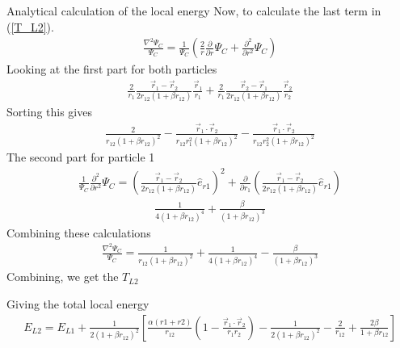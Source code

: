 \documentclass[a4paper, 12pt, titlepage]{article}
\begin{document}
\begin{section}{Analytical calculation of the local energy}
 Now, to calculate the last term in (\ref{T_L2}). 
 \begin{align}
 	\frac{\nabla^2 \Psi_C}{\Psi_C} = \frac{1}{\Psi_C} \left( \frac{2}{r} \frac{\partial}{\partial r}\Psi_C + \frac{\partial^2 }{\partial r^2} \Psi_C \right)
 \end{align}
 Looking at the first part for both particles
 \begin{align*}
 	\frac{2}{r_1} \frac{\vec r_1 - \vec r_2}{2r_{12} \left(1+\beta r_{12} \right)} \frac{\vec r_1}{r_1} + \frac{2}{r_1} \frac{\vec r_2 - \vec r_1}{2r_{12} \left(1+\beta r_{12} \right)} \frac{\vec r_2}{r_2}
 \end{align*}
 Sorting this gives
 \begin{align*}
 	\frac{2}{r_{12}(1+\beta r_{12})^2} - \frac{\vec r_1 \cdot \vec r_2}{r_{12} r_1^2 (1 +\beta r_{12})^2} - \frac{\vec r_1 \cdot \vec r_2}{r_{12} r_2^2 (1+\beta r_{12})^2}
 \end{align*}
 The second part for particle 1
 \begin{align*}
 	\frac{1}{\Psi_C} \frac{\partial^2 }{\partial r^2} \Psi_C = \left( \frac{\vec r_1 - \vec r_2}{2r_{12} \left(1+\beta r_{12} \right)} \hat e_{r1} \right)^2 + \frac{\partial}{\partial r_1} \left( \frac{\vec r_1 - \vec r_2}{2r_{12} \left(1+\beta r_{12}  \right)} \hat e_{r1} \right) 
 \end{align*}
 \begin{align*}
 	\frac{1}{4(1+\beta r_{12})^4} + \frac{\beta}{(1+\beta r_{12})^3}
 \end{align*}
 Combining these calculations
 \begin{align*}
 	 \frac{\nabla^2 \Psi_C}{\Psi_C} = \frac{1}{r_{12}(1+\beta r_{12})^2} + \frac{1}{4(1+\beta r_{12})^4} - \frac{\beta}{(1+\beta r_{12})^3}
 \end{align*}
 Combining, we get the $T_{L2}$
 
 Giving the total local energy
 \begin{align*}
 	E_{L2} = E_{L1} + \frac{1}{2(1+\beta r_{12})^2} \left[ \frac{\alpha (r1+r2)}{r_{12}} \left(1 - \frac{\vec r_1 \cdot \vec r_2}{r_1 r_2} \right) - \frac{1}{2(1+\beta r_{12})^2} - \frac{2}{r_{12}} + \frac{2 \beta}{1 + \beta r_{12}} \right]
 \end{align*}



 \end{section}

 
\end{document}
